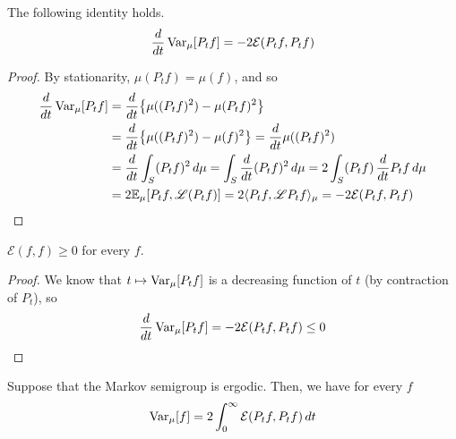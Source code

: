   \begin{lemma}
  The following identity holds. 
  \[\frac{d}{dt} \operatorname{Var}_\mu [P_t f] = -2 \mathcal{E} (P_t f, P_t f)\]
  \end{lemma}
  \begin{proof}
  By stationarity, $\mu (P_t f) = \mu(f)$, and so 
  \begin{align*}
      \frac{d}{dt} \operatorname{Var}_\mu [P_t f] & = \frac{d}{dt} \big\{ \mu((P_t f)^2) - \mu(P_t f)^2\big\} \\
      & = \frac{d}{dt} \big\{ \mu((P_t f)^2) - \mu( f)^2\big\} = \frac{d}{dt} \mu((P_t f)^2) \\
      & = \frac{d}{dt} \int_S (P_t f)^2 \, d\mu = \int_S \frac{d}{dt} (P_t f)^2 \,d\mu = 2 \int_S (P_t f) \, \frac{d}{dt} P_t f \, d\mu \\
      & = 2 \mathbb{E}_\mu [P_t f, \mathscr{L} (P_t f) ] = 2 \langle P_t f, \mathscr{L} P_t f \rangle_\mu = -2 \mathcal{E}(P_t f, P_t f) 
  \end{align*}
  \end{proof}

  \begin{theorem}
  $\mathcal{E}(f, f) \geq 0$ for every $f$. 
  \end{theorem}
  \begin{proof}
  We know that $t \mapsto \operatorname{Var}_\mu [P_t f]$ is a decreasing function of $t$ (by contraction of $P_t$), so 
  \[\frac{d}{dt} \operatorname{Var}_\mu [P_t f] = - 2 \mathcal{E}(P_t f, P_t f) \leq 0\]
  \end{proof}

  \begin{theorem}
  Suppose that the Markov semigroup is ergodic. Then, we have for every $f$ 
  \[\operatorname{Var}_\mu [f] = 2 \int_0^\infty \mathcal{E}(P_t f, P_t f) \, dt\]
  \end{theorem}


